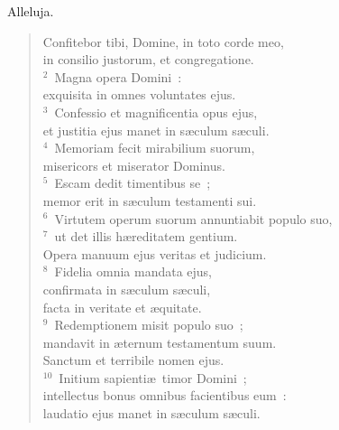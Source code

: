 \bchapter
\lettrine[lines=3,image=true,loversize=0.05,lraise=-0.03]{A}{}lleluja. \begin{flushleft}\begin{verse}\vspace{6pt}Confitebor tibi, Domine, in toto corde meo,\\ in consilio justorum, et congregatione.\\
${}^{2}$~Magna opera Domini~:\\ exquisita in omnes voluntates ejus.\\
${}^{3}$~Confessio et magnificentia opus ejus,\\ et justitia ejus manet in s\ae culum s\ae culi.\\
${}^{4}$~Memoriam fecit mirabilium suorum,\\ misericors et miserator Dominus.\\
${}^{5}$~Escam dedit timentibus se~;\\ memor erit in s\ae culum testamenti sui.\\
${}^{6}$~Virtutem operum suorum annuntiabit populo suo,\\
${}^{7}$~ut det illis h\ae reditatem gentium.\\ Opera manuum ejus veritas et judicium.\\
${}^{8}$~Fidelia omnia mandata ejus,\\ confirmata in s\ae culum s\ae culi,\\ facta in veritate et \ae quitate.\\
${}^{9}$~Redemptionem misit populo suo~;\\ mandavit in \ae ternum testamentum suum.\\ Sanctum et terribile nomen ejus.\\
${}^{10}$~Initium sapienti\ae\ timor Domini~;\\ intellectus bonus omnibus facientibus eum~:\\ laudatio ejus manet in s\ae culum s\ae culi.\end{verse}\end{flushleft}



